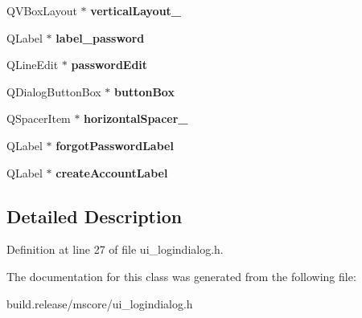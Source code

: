 \begin{DoxyCompactItemize}
Q\+V\+Box\+Layout $\ast$ {\bfseries vertical\+Layout\+\_}
\item 
\mbox{\label{class_ui___login_dialog_ac3a37543b200a83f8c583923db27c536}} 
Q\+Label $\ast$ {\bfseries label\+\_\+password}
\item 
\mbox{\label{class_ui___login_dialog_a3cb1510e8fb34fec887a5ad7bda8dee1}} 
Q\+Line\+Edit $\ast$ {\bfseries password\+Edit}
\item 
\mbox{\label{class_ui___login_dialog_ad51d5c19af044d5be12fa23992c0e3d2}} 
Q\+Dialog\+Button\+Box $\ast$ {\bfseries button\+Box}
\item 
\mbox{\label{class_ui___login_dialog_aed67e0d8e083d6b7686078a85bd9556f}} 
Q\+Spacer\+Item $\ast$ {\bfseries horizontal\+Spacer\+\_}
\item 
\mbox{\label{class_ui___login_dialog_ab4a3b7b6a21770b5254ae5f38016aa50}} 
Q\+Label $\ast$ {\bfseries forgot\+Password\+Label}
\item 
\mbox{\label{class_ui___login_dialog_a9ace56ec7c051e233ad3f97ffb2d45f5}} 
Q\+Label $\ast$ {\bfseries create\+Account\+Label}
\end{DoxyCompactItemize}


\subsection{Detailed Description}


Definition at line 27 of file ui\+\_\+logindialog.\+h.



The documentation for this class was generated from the following file\+:\begin{DoxyCompactItemize}
\item 
build.\+release/mscore/ui\+\_\+logindialog.\+h\end{DoxyCompactItemize}
